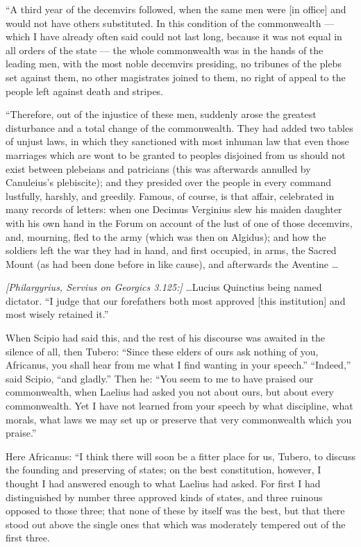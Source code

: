  ``A third year of the decemvirs followed, when the same men were [in office] and would not have others substituted. In this condition of the commonwealth --- which I have already often said could not last long, because it was not equal in all orders of the state --- the whole commonwealth was in the hands of the leading men, with the most noble decemvirs presiding, no tribunes of the plebs set against them, no other magistrates joined to them, no right of appeal to the people left against death and stripes.

 ``Therefore, out of the injustice of these men, suddenly arose the greatest disturbance and a total change of the commonwealth. They had added two tables of unjust laws, in which they sanctioned with most inhuman law that even those marriages which are wont to be granted to peoples disjoined from us should not exist between plebeians and patricians (this was afterwards annulled by Canuleius's plebiscite); and they presided over the people in every command lustfully, harshly, and greedily. Famous, of course, is that affair, celebrated in many records of letters: when one Decimus Verginius slew his maiden daughter with his own hand in the Forum on account of the lust of one of those decemvirs, and, mourning, fled to the army (which was then on Algidus); and how the soldiers left the war they had in hand, and first occupied, in arms, the Sacred Mount (as had been done before in like cause), and afterwards the Aventine \ldots

 \textit{[Philargyrius, Servius on Georgics 3.125:]} \ldots Lucius Quinctius being named dictator. ``I judge that our forefathers both most approved [this institution] and most wisely retained it.''

 When Scipio had said this, and the rest of his discourse was awaited in the silence of all, then Tubero: ``Since these elders of ours ask nothing of you, Africanus, you shall hear from me what I find wanting in your speech.'' ``Indeed,'' said Scipio, ``and gladly.'' Then he: ``You seem to me to have praised our commonwealth, when Laelius had asked you not about ours, but about every commonwealth. Yet I have not learned from your speech by what discipline, what morals, what laws we may set up or preserve that very commonwealth which you praise.''

 Here Africanus: ``I think there will soon be a fitter place for us, Tubero, to discuss the founding and preserving of states; on the best constitution, however, I thought I had answered enough to what Laelius had asked. For first I had distinguished by number three approved kinds of states, and three ruinous opposed to those three; that none of these by itself was the best, but that there stood out above the single ones that which was moderately tempered out of the first three.

